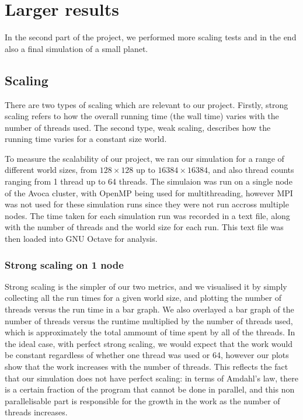 \documentclass[a4paper]{article}
\begin{document}
\section{Larger results}

In the second part of the project, we performed more scaling tests and in the end also a final simulation of a small planet.

\subsection{Scaling}

There are two types of scaling which are relevant to our project.
Firstly, strong scaling refers to how the overall running time (the wall time) varies with the number of threads used.
The second type, weak scaling, describes how the running time varies for a constant size world.

To measure the scalability of our project, we ran our simulation for a range of different world sizes, from $128 \times 128$ up to $16384 \times 16384$, and also thread counts ranging from 1 thread up to 64 threads.
The simulaion was run on a single node of the Avoca cluster, with OpenMP being used for multithreading, however MPI was not used for these simulation runs since they were not run accross multiple nodes.
The time taken for each simulation run was recorded in a text file, along with the number of threads and the world size for each run.
This text file was then loaded into GNU Octave for analysis.

\subsubsection{Strong scaling on 1 node}

Strong scaling is the simpler of our two metrics, and we visualised it by simply collecting all the run times for a given world size, and plotting the number of threads versus the run time in a bar graph.
We also overlayed a bar graph of the number of threads versus the runtime multiplied by the number of threads used, which is approximately the total ammount of time spent by all of the threads.
In the ideal case, with perfect strong scaling, we would expect that the work would be constant regardless of whether one thread was used or 64, however our plots show that the work increases with the number of threads.
This reflects the fact that our simulation does not have perfect scaling: in terms of Amdahl's law, there is a certain fraction of the program that cannot be done in parallel, and this non parallelisable part is responsible for the growth in the work as the number of threads increases.
\end{document}

